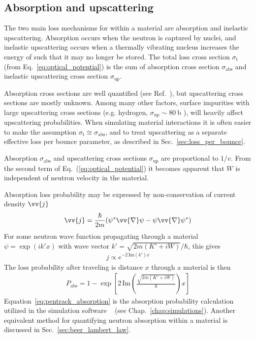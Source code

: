 
\subsection{Absorption and upscattering}\label{sec:ucn_absorption}


The two main loss mechanisms for \ucn within a material are absorption and inelastic upscattering. Absorption occurs when the neutron is captured by nuclei, and inelastic upscattering occurs when a thermally vibrating nucleus increases the energy of \ucn such that it may no longer be stored. The total loss cross section $\sigma_{\text{t}}$ (from Eq.~\ref{eq:optical_potential}) is the sum of absorption cross section $\sigma_\text{abs}$ and inelastic upscattering cross section $\sigma_\text{up}$.

Absorption cross sections are well quantified (see Ref.~\cite{nist_neutron_cross_sections}), but upscattering cross sections are mostly unknown. Among many other factors, surface impurities with large upscattering cross sections (e.g. hydrogen, $\sigma_\text{up} \sim \qty{80}{\barn}$ \cite{nist_neutron_cross_sections}), will heavily affect upscattering probabilities. When simulating \ucn material interactions it is often easier to make the assumption $\sigma_{\text{t}} \cong \sigma_\text{abs}$, and to treat upscattering as a separate effective loss per bounce parameter, as described in Sec.~\ref{sec:loss_per_bounce}.

Absorption $\sigma_\text{abs}$ and upscattering cross sections $\sigma_\text{up}$ are proportional to $1/v$. From the second term of Eq.~(\ref{eq:optical_potential}) it becomes apparent that $W$ is independent of neutron velocity in the material.

Absorption loss probability may be expressed by non-conservation of current density $\vv{j}$ \cite{golubUCN}
%
\begin{gather}
    \vv{j} = \frac{\hbar}{2m} ( \psi^* \vv{\nabla} \psi - \psi \vv{\nabla}\psi^*)
\end{gather}
%
For some neutron wave function propagating through a material $\psi = \exp (ik'x)$ with wave vector $k'=\sqrt{2m(K'+iW)}/\hbar$, this gives
%
\begin{gather}
    j \propto e^{-2\,\text{Im}(k')x}
\end{gather}
%
The loss probability after traveling is distance $x$ through a material is then
%
\begin{gather}
    P_\text{abs}= 1 - \exp \left[2\,\text{Im}\left( \frac{\sqrt{2m(K'+iW)}}{\hbar}\right)x \right]\label{eq:pentrack_absorption}
\end{gather}
%
Equation~\ref{eq:pentrack_absorption} is the absorption probability calculation utilized in the \ucn simulation software \pentrack~\cite{schreyer_pentrack} (see Chap.~\ref{chap:simulations}). Another equivalent method for quantifying neutron absorption within a material is discussed in Sec.~\ref{sec:beer_lambert_law}.

